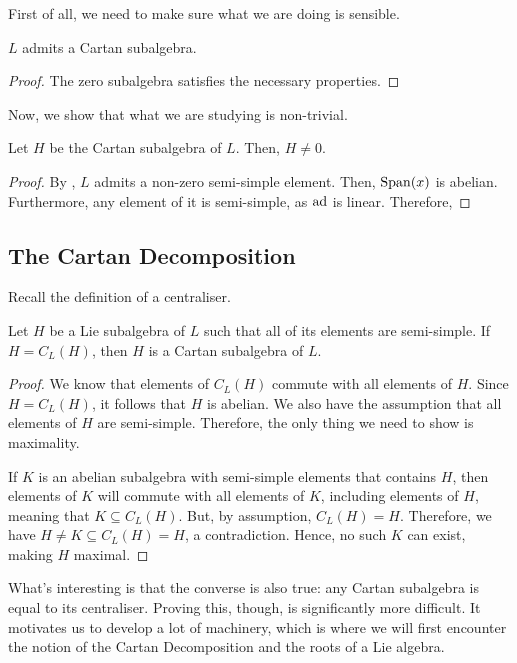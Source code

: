First of all, we need to make sure what we are doing is sensible.

\begin{lemma}
    $L$ admits a Cartan subalgebra.
\end{lemma}
\begin{proof}
    The zero subalgebra satisfies the necessary properties. %
\end{proof}

Now, we show that what we are studying is non-trivial.

\begin{boxproposition}
    Let $H$ be the Cartan subalgebra of $L$. Then, $H \neq 0$.
\end{boxproposition}
\begin{proof}
    By , $L$ admits a non-zero semi-simple element. Then, $\operatorname{Span}\!\left( x \right)$ is abelian. Furthermore, any element of it is semi-simple, as $\operatorname{ad}$ is linear. Therefore, \sorry
\end{proof}

\subsection{The Cartan Decomposition}

Recall the definition of a centraliser. %

\begin{lemma}
    Let $H$ be a Lie subalgebra of $L$ such that all of its elements are semi-simple. If $H = C_L(H)$, then $H$ is a Cartan subalgebra of $L$.
\end{lemma}
\begin{proof}
    We know that elements of $C_L(H)$ commute with all elements of $H$. Since $H = C_L(H)$, it follows that $H$ is abelian. We also have the assumption that all elements of $H$ are semi-simple. Therefore, the only thing we need to show is maximality.
    
    If $K$ is an abelian subalgebra with semi-simple elements that contains $H$, then elements of $K$ will commute with all elements of $K$, including elements of $H$, meaning that $K \subseteq C_L(H)$. But, by assumption, $C_L(H) = H$. Therefore, we have $H \neq K \subseteq C_L(H) = H$, a contradiction. Hence, no such $K$ can exist, making $H$ maximal.
\end{proof}

What's interesting is that the converse is also true: any Cartan subalgebra is equal to its centraliser. Proving this, though, is significantly more difficult. It motivates us to develop a lot of machinery, which is where we will first encounter the notion of the Cartan Decomposition and the roots of a Lie algebra.

